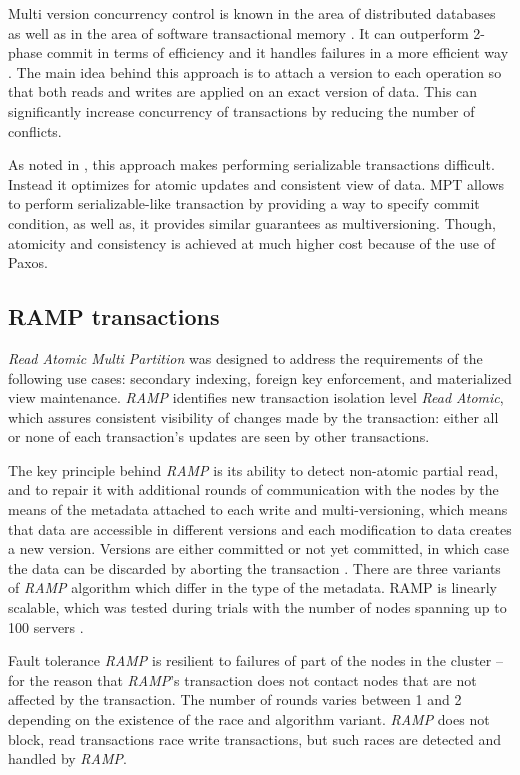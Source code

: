 \documentclass[runningheads,a4paper]{llncs}
\begin{document}
Multi version concurrency control \cite{Bernstein:1983} is known in the area of distributed databases as well as in the area of software transactional memory \cite{Perelman:2010}. It can outperform 2-phase commit in terms of efficiency and it handles failures in a more efficient way \cite{Halici:1991}. The main idea behind this approach is to attach a version to each operation so that both reads and writes are applied on an exact version of data. This can significantly increase concurrency of transactions by reducing the number of conflicts. 

As noted in \cite{Faleiro:2015}, this approach makes performing serializable transactions difficult. Instead it optimizes for atomic updates and consistent view of data. MPT allows to perform serializable-like transaction by providing a way to specify commit condition, as well as, it provides similar guarantees as multiversioning. Though, atomicity and consistency is achieved at much higher cost because of the use of Paxos.

\subsection{RAMP transactions} 
\emph{Read Atomic Multi Partition} \cite{Bailis:2014} was designed to address the requirements of the following use cases: secondary indexing, foreign key enforcement, and materialized view maintenance. \emph{RAMP} identifies new transaction isolation level \emph{Read Atomic}, which assures consistent visibility of changes made by the transaction: either all or none of each transaction’s updates are seen by other transactions.

The key principle behind \emph{RAMP} is its ability to detect non-atomic partial read, and to repair it with additional rounds of communication with the nodes by the means of the metadata attached to each write and multi-versioning, which means that data are accessible in different versions and each modification to data creates a new version. Versions are either committed or not yet committed, in which case the data can be discarded by aborting the transaction \cite[p. 6]{Bailis:2014}. There are three variants of \emph{RAMP} algorithm which differ in the type of the metadata. RAMP is linearly scalable, which was tested during trials with the number of nodes spanning up to 100 servers \cite[p. 10]{Bailis:2014}.

Fault tolerance \emph{RAMP} is resilient to failures of part of the nodes in the cluster – for the reason that \emph{RAMP}’s transaction does not contact nodes that are not affected by the transaction. The number of rounds varies between 1 and 2 depending on the existence of the race and algorithm variant. \emph{RAMP} does not block, read transactions race write transactions, but such races are detected and handled by \emph{RAMP}.
\end{document}
